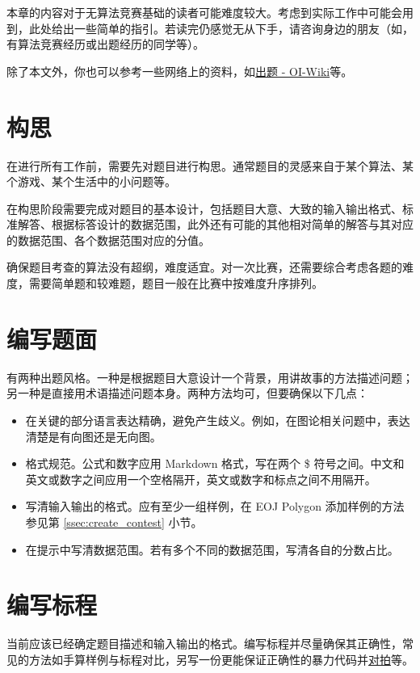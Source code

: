 \documentclass[oneside]{book}
\begin{document}
本章的内容对于无算法竞赛基础的读者可能难度较大。考虑到实际工作中可能会用到，此处给出一些简单的指引。若读完仍感觉无从下手，请咨询身边的朋友（如，有算法竞赛经历或出题经历的同学等）。

除了本文外，你也可以参考一些网络上的资料，如\href{https://oi-wiki.org/contest/problemsetting/}{出题 - OI-Wiki}等。

\section{构思}

在进行所有工作前，需要先对题目进行构思。通常题目的灵感来自于某个算法、某个游戏、某个生活中的小问题等。

在构思阶段需要完成对题目的基本设计，包括题目大意、大致的输入输出格式、标准解答、根据标答设计的数据范围，此外还有可能的其他相对简单的解答与其对应的数据范围、各个数据范围对应的分值。

确保题目考查的算法没有超纲，难度适宜。对一次比赛，还需要综合考虑各题的难度，需要简单题和较难题，题目一般在比赛中按难度升序排列。

\section{编写题面}

有两种出题风格。一种是根据题目大意设计一个背景，用讲故事的方法描述问题；另一种是直接用术语描述问题本身。两种方法均可，但要确保以下几点：

\begin{itemize}
  \item 在关键的部分语言表达精确，避免产生歧义。例如，在图论相关问题中，表达清楚是有向图还是无向图。
  \item 格式规范。公式和数字应用 Markdown 格式，写在两个 \$ 符号之间。中文和英文或数字之间应用一个空格隔开，英文或数字和标点之间不用隔开。
  \item 写清输入输出的格式。应有至少一组样例，在 EOJ Polygon 添加样例的方法参见第 \ref{ssec:create_contest} 小节。
  \item 在提示中写清数据范围。若有多个不同的数据范围，写清各自的分数占比。
\end{itemize}

\section{编写标程}

当前应该已经确定题目描述和输入输出的格式。编写标程并尽量确保其正确性，常见的方法如手算样例与标程对比，另写一份更能保证正确性的暴力代码并\href{https://oi-wiki.org/contest/common-tricks/}{对拍}等。
\end{document}
